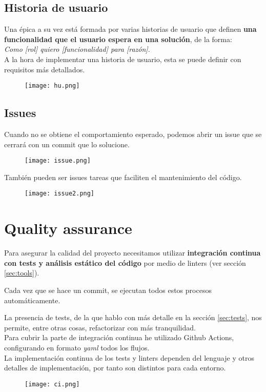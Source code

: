 \subsection{Historia de usuario}
Una épica a su vez está formada por varias historias de usuario que definen \textbf{una funcionalidad que el usuario espera en una solución}, de la forma:\\ \textit{Como [rol] quiero [funcionalidad] para [razón].}\\

A la hora de implementar una historia de usuario, esta se puede definir con requisitos más detallados.

\begin{figure}[H]
	\centering	
	\texttt{[image: hu.png]}
	\end{figure}

\subsection{Issues}
Cuando no se obtiene el comportamiento esperado, podemos abrir un issue que se cerrará con un commit que lo solucione.

\begin{figure}[H]
	\centering	
	\texttt{[image: issue.png]}
	\end{figure}

	También pueden ser issues tareas que faciliten el mantenimiento del código.

\begin{figure}[H]
	\centering	
	\texttt{[image: issue2.png]}
	\end{figure}


\section{Quality assurance}

Para asegurar la calidad del proyecto necesitamos utilizar \textbf{integración continua con tests y análisis estático del código} por medio de linters (ver sección \ref{sec:tools}).


Cada vez que se hace un commit, se ejecutan todos estos procesos automáticamente.

La presencia de tests, de la que hablo con más detalle en la sección \ref{sec:tests}, nos permite, entre otras cosas, refactorizar con más 
tranquilidad. \\

Para cubrir la parte de integración continua he utilizado Github Actions,  configurando en formato \textit{yaml} todos los flujos.\\
La implementación continua de los tests y linters dependen del lenguaje y otros detalles de implementación, por tanto
son distintos para cada entorno.
\begin{figure}[H]
	\centering	
	\texttt{[image: ci.png]}
	\end{figure}

